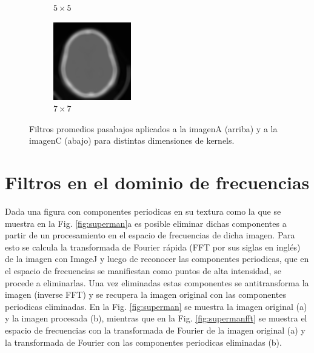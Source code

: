 \documentclass[11pt,twocolumn,twoside]{opticajnl}
\begin{document}
\begin{figure}[h]
\begin{subfigure}[h]{0.24\linewidth}
            \caption{$5\times5$} 
         \end{subfigure}
         \begin{subfigure}[h]{0.24\linewidth}
            \centering
            \includegraphics[width=\textwidth]{Figuras/ImagenC7x7.png}
            \caption{$7\times7$} 
         \end{subfigure}
    \caption{Filtros promedios pasabajos aplicados a la imagenA (arriba) y a la imagenC (abajo) para distintas dimensiones de kernels.}
    \label{fig:Pasabajo}
\end{figure}


\section{Filtros en el dominio de frecuencias\label{sec:ej5}}

\vspace{0.3cm}

Dada una figura con componentes periodicas en su textura como la que se muestra en la Fig. \ref{fig:superman}a es posible eliminar dichas componentes a partir de un procesamiento en el espacio de frecuencias de dicha imagen. Para esto se calcula la transformada de Fourier rápida (FFT por sus siglas en inglés) de la imagen con ImageJ y luego de reconocer las componentes periodicas, que en el espacio de frecuencias se manifiestan como puntos de alta intensidad, se procede a eliminarlas. Una vez eliminadas estas componentes se antitransforma la imagen (inverse FFT) y se recupera la imagen original con las componentes periodicas eliminadas. En la Fig. \ref{fig:superman} se muestra la imagen original (a) y la imagen procesada (b), mientras que en la Fig. \ref{fig:supermanfft} se muestra el espacio de frecuencias con la transformada de Fourier de la imagen original (a) y la transformada de Fourier con las componentes periodicas eliminadas (b). 
\end{document}
